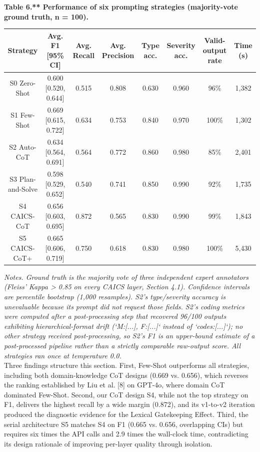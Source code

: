 \documentclass[11pt]{article}
\begin{document}
\textbf{Table 6.** Performance of six prompting strategies (majority-vote ground truth, n = 100).}
\begin{table}[htbp]
\centering
\small
\begin{tabular}{cccccccc}
\hline
Strategy & Avg. F1 [95\% CI] & Avg. Recall & Avg. Precision & Type acc. & Severity acc. & Valid-output rate & Time (s) \\
\hline
S0 Zero-Shot & 0.600 [0.520, 0.644] & 0.515 & 0.808 & 0.630 & 0.960 & 96\% & 1,382 \\
S1 Few-Shot & 0.669 [0.615, 0.722] & 0.634 & 0.753 & 0.840 & 0.970 & 100\% & 1,302 \\
S2 Auto-CoT & 0.634 [0.564, 0.691] & 0.564 & 0.772 & 0.860 & 0.980 & 85\% & 2,401 \\
S3 Plan-and-Solve & 0.598 [0.529, 0.652] & 0.540 & 0.741 & 0.850 & 0.990 & 92\% & 1,735 \\
S4 CAICS-CoT & 0.656 [0.603, 0.695] & 0.872 & 0.565 & 0.830 & 0.990 & 99\% & 1,843 \\
S5 CAICS-CoT+ & 0.665 [0.606, 0.719] & 0.750 & 0.618 & 0.830 & 0.980 & 100\% & 5,430 \\
\hline
\end{tabular}
\end{table}
\textit{\textit{Notes.} Ground truth is the majority vote of three independent expert annotators (Fleiss' Kappa > 0.85 on every CAICS layer, Section 4.1). Confidence intervals are percentile bootstrap (1,000 resamples). S2's type/severity accuracy is unevaluable because its prompt did not request those fields. S2's coding metrics were computed after a post-processing step that recovered 96/100 outputs exhibiting hierarchical-format drift (`{M:[...], F:[...]}` instead of `{codes:[...]}`); no other strategy received post-processing, so S2's F1 is an upper-bound estimate of a post-processed pipeline rather than a strictly comparable raw-output score. All strategies ran once at temperature 0.0.}\\
Three findings structure this section. First, Few-Shot outperforms all strategies, including both domain-knowledge CoT designs (0.669 vs. 0.656), which reverses the ranking established by Liu et al. [8] on GPT-4o, where domain CoT dominated Few-Shot. Second, our CoT design S4, while not the top strategy on F1, delivers the highest recall by a wide margin (0.872), and its v1-to-v2 iteration produced the diagnostic evidence for the Lexical Gatekeeping Effect. Third, the serial architecture S5 matches S4 on F1 (0.665 vs. 0.656, overlapping CIs) but requires six times the API calls and 2.9 times the wall-clock time, contradicting its design rationale of improving per-layer quality through isolation.
\end{document}
